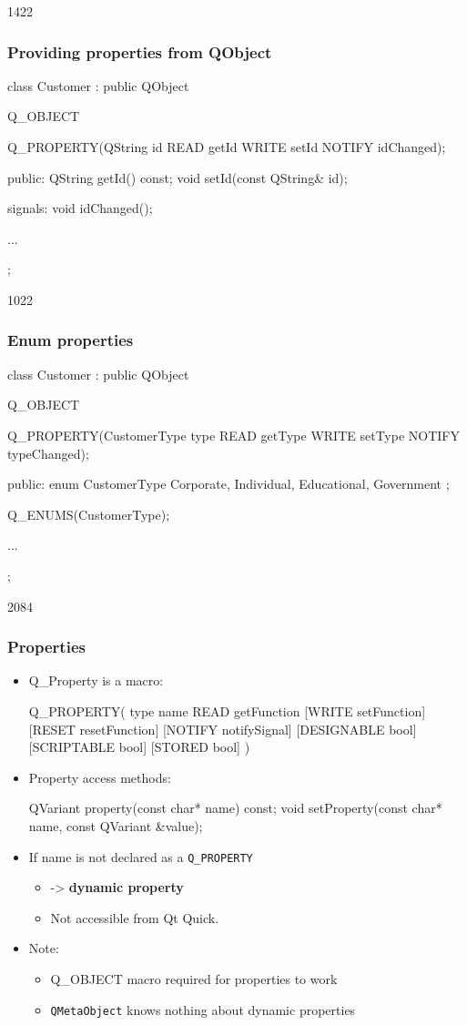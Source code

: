 \begin{slide}[fragile]{1422}
\frametitle{Providing properties from QObject}
\begin{cpp}
class Customer : public QObject
{
    Q_OBJECT

    Q_PROPERTY(QString id READ getId WRITE setId NOTIFY idChanged);

  public:
     QString getId() const;
     void setId(const QString& id);
  
  signals:
     void idChanged();

  ...
};
\end{cpp}
\end{slide}

\begin{slide}[fragile]{1022}
\frametitle{Enum properties}
\begin{cpp}
class Customer : public QObject
{
    Q_OBJECT

    Q_PROPERTY(CustomerType type READ getType WRITE setType 
               NOTIFY typeChanged);

  public:
    enum CustomerType {
      Corporate, Individual, Educational, Government
    };

    Q_ENUMS(CustomerType);
    
  ...
};
\end{cpp}
\end{slide}

\begin{slide}[fragile]{2084}
\frametitle{Properties}
\begin{itemize}
  \item Q\_Property is a macro:
\begin{cpp}
  Q_PROPERTY( type name READ getFunction [WRITE setFunction]
  [RESET resetFunction] [NOTIFY notifySignal] [DESIGNABLE bool]
  [SCRIPTABLE bool] [STORED bool] )
\end{cpp}
  \medskip
  \item Property access methods:
\begin{cpp}
  QVariant property(const char* name) const;
  void setProperty(const char* name, const QVariant &value);
\end{cpp}
  \medskip
  \item If name is not declared as a \texttt{Q\_PROPERTY}
  \begin{itemize}
    \item -> \textbf{dynamic property}
    \item Not accessible from Qt Quick.
  \end{itemize}
  \medskip
  \item Note:
  \begin{itemize}
    \item Q\_OBJECT macro required for properties to work
    \item \texttt{QMetaObject} knows nothing about dynamic properties
  \end{itemize}
\end{itemize}
\end{slide}

